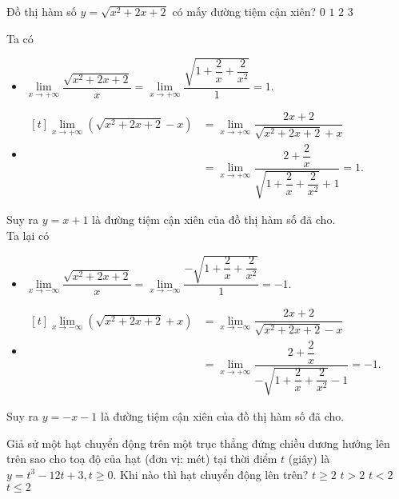 \begin{ex}%
	Đồ thị hàm số $y=\sqrt{x^2+2x+2}$ có mấy đường tiệm cận xiên?
	\choice
	{$0$}
	{$1$}
	{\True $2$}
	{$3$}
	\loigiai
	{
		Ta có
		\begin{itemize}
			\item $\lim\limits_{x\to +\infty}\dfrac{\sqrt{x^2+2x+2}}{x}=\lim\limits_{x\to +\infty}\dfrac{\sqrt{1+\dfrac 2x+\dfrac2{x^2}}}{1}=1$.
			\item $\begin{aligned}[t]
					      \lim\limits_{x\to+\infty}\left(\sqrt{x^2+2x+2}-x\right) & =\lim\limits_{x\to +\infty}\dfrac{2x+2}{\sqrt{x^2+2x+2}+x} \\&=\lim\limits_{x\to+\infty}\dfrac{2+\dfrac2x}{\sqrt{1+\dfrac2x+\dfrac2{x^2}}+1}=1.
				      \end{aligned}$
		\end{itemize}
		Suy ra $y=x+1$ là đường tiệm cận xiên của đồ thị hàm số đã cho.\\
		Ta lại có
		\begin{itemize}
			\item $\lim\limits_{x\to -\infty}\dfrac{\sqrt{x^2+2x+2}}{x}=\lim\limits_{x\to -\infty}\dfrac{-\sqrt{1+\dfrac 2x+\dfrac2{x^2}}}{1}=-1$.
			\item $\begin{aligned}[t]
					      \lim\limits_{x\to-\infty}\left(\sqrt{x^2+2x+2}+x\right) & =\lim\limits_{x\to -\infty}\dfrac{2x+2}{\sqrt{x^2+2x+2}-x} \\&=\lim\limits_{x\to+\infty}\dfrac{2+\dfrac2x}{-\sqrt{1+\dfrac2x+\dfrac2{x^2}}-1}=-1.
				      \end{aligned}$
		\end{itemize}
		Suy ra $y=-x-1$ là đường tiệm cận xiên của đồ thị hàm số đã cho.
	}
\end{ex}

\begin{ex}%
	Giả sử một hạt chuyển động trên một trục thẳng đứng chiều dương hướng lên trên sao cho toạ độ của hạt (đơn vị: mét) tại thời điểm $t$ (giây) là $y=t^3-12t+3, t \geq 0$. Khi nào thì hạt chuyển động lên trên?
	\choice
	{\True $t \ge 2 $}
	{ $t > 2$}
	{$t < 2$}
	{$t \le 2$}
\end{ex}

